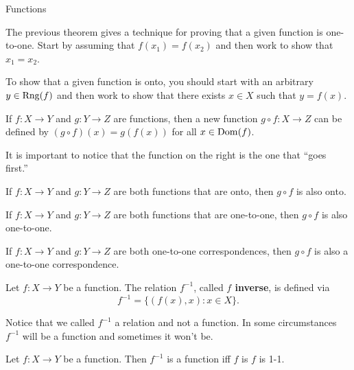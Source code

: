 \begin{section}{Functions}
\begin{remark}
The previous theorem gives a technique for proving that a given function is one-to-one.  Start by assuming that $f(x_{1})=f(x_{2})$ and then work to show that $x_{1}=x_{2}$.
\end{remark}

\begin{remark}
To show that a given function is onto, you should start with an arbitrary $y\in \operatorname{Rng}(f)$ and then work to show that there exists $x\in X$ such that $y=f(x)$.
\end{remark}

\begin{definition}
If $f:X\to Y$ and $g:Y\to Z$ are functions, then a new function $g\circ f:X\to Z$ can be defined by $(g\circ f)(x)=g(f(x))$ for all $x\in\operatorname{Dom}(f)$.
\end{definition}

\begin{remark}
It is important to notice that the function on the right is the one that ``goes first.''
\end{remark}

\begin{theorem}
If $f:X\to Y$ and $g:Y\to Z$ are both functions that are onto, then $g\circ f$ is also onto.
\end{theorem}

\begin{theorem}
If $f:X\to Y$ and $g:Y\to Z$ are both functions that are one-to-one, then $g\circ f$ is also one-to-one.
\end{theorem}

\begin{corollary}
If $f:X\to Y$ and $g:Y\to Z$ are both one-to-one correspondences, then $g\circ f$ is also a one-to-one correspondence.
\end{corollary}

\begin{definition}
Let $f:X\to Y$ be a function.  The relation $f^{-1}$, called \textbf{$f$ inverse}, is defined via
\[
f^{-1}=\{(f(x),x):x\in X\}.
\]
\end{definition}

\begin{remark}
Notice that we called $f^{-1}$ a relation and not a function.  In some circumstances $f^{-1}$ will be a function and sometimes it won't be.
\end{remark}

\begin{theorem}
Let $f:X\to Y$ be a function.  Then $f^{-1}$ is a function iff $f$ is $f$ is 1-1.
\end{theorem}


\end{section}
